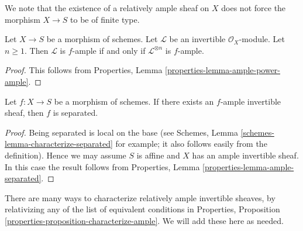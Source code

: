 \noindent
We note that the existence of a relatively ample sheaf on $X$ does not
force the morphism $X \to S$ to be of finite type.

\begin{lemma}
\label{lemma-ample-power-ample}
Let $X \to S$ be a morphism of schemes.
Let $\mathcal{L}$ be an invertible $\mathcal{O}_X$-module.
Let $n \geq 1$. Then $\mathcal{L}$ is $f$-ample if and only if
$\mathcal{L}^{\otimes n}$ is $f$-ample.
\end{lemma}

\begin{proof}
This follows from Properties, Lemma \ref{properties-lemma-ample-power-ample}.
\end{proof}

\begin{lemma}
\label{lemma-relatively-ample-separated}
Let $f : X \to S$ be a morphism of schemes.
If there exists an $f$-ample invertible sheaf, then
$f$ is separated.
\end{lemma}

\begin{proof}
Being separated is local on the base (see
Schemes, Lemma \ref{schemes-lemma-characterize-separated} for example;
it also follows easily from the definition).
Hence we may assume $S$ is affine and $X$
has an ample invertible sheaf. In this case the
result follows from
Properties, Lemma \ref{properties-lemma-ample-separated}.
\end{proof}

\noindent
There are many ways to characterize relatively ample invertible
sheaves, by relativizing any of the list of equivalent conditions in
Properties, Proposition \ref{properties-proposition-characterize-ample}.
We will add these here as needed.


